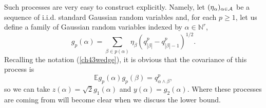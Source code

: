 \documentclass[12pt]{article}
\newcommand{\A}{{\cal A}}
\newcommand{\e}{\mathbb{E}}
\newcommand{\Natural}{\mathbb{N}}
\theoremstyle{nonumberplain}
\begin{document}
Such processes are very easy to construct explicitly. Namely, let $(\eta_\alpha)_{\alpha \in \A}$ be a sequence of i.i.d. standard Gaussian random variables and, for each $p\geq 1$, let us define a family of Gaussian random variables indexed by $\alpha\in \Natural^r$,
\begin{equation}
g_p(\alpha) = \sum_{\beta\in p(\alpha)} \eta_\beta (q_{|\beta|}^p - q_{|\beta|-1}^p)^{1/2}.
\label{ch43etas}
\end{equation}
Recalling the notation (\ref{ch43wedge}), it is obvious that the covariance of this process is 
\begin{equation}
\e g_p(\alpha)g_p(\beta) = q_{\alpha\wedge \beta}^p,
\label{ch43Cov}
\end{equation}
so we can take $z(\alpha) = \sqrt{2} g_1(\alpha)$ and $y(\alpha) = g_2(\alpha)$. Where these processes are coming from will become clear when we discuss the lower bound.
\end{document}
